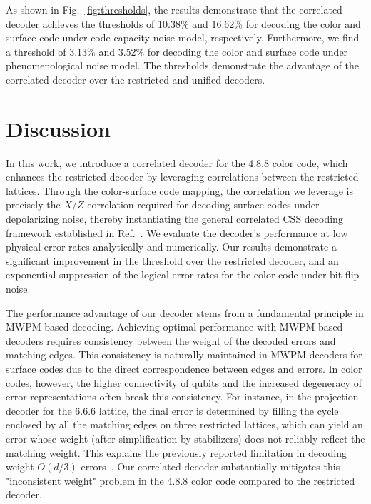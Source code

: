\documentclass[%
 reprint,
 amsmath,amssymb,
 aps,
]{revtex4-2}
\begin{document}
As shown in Fig.~\ref{fig:thresholds}, the results demonstrate that the correlated decoder achieves the thresholds of 10.38\% and 16.62\% for decoding the color and surface code under code capacity noise model, respectively. Furthermore, we find a threshold of 3.13\% and 3.52\% for decoding the color and surface code under phenomenological noise model. The thresholds demonstrate the advantage of the correlated decoder over the restricted and unified decoders.



\section{\label{sec:discussion}Discussion}

In this work, we introduce a correlated decoder for the 4.8.8 color code, which enhances the restricted decoder by leveraging correlations between the restricted lattices. Through the color-surface code mapping, the correlation we leverage is precisely the $X$/$Z$ correlation required for decoding surface codes under depolarizing noise, thereby instantiating the general correlated CSS decoding framework established in Ref.~\cite{delfosse2014decoding_cc}. We evaluate the decoder's performance at low physical error rates analytically and numerically. Our results demonstrate a significant improvement in the threshold over the restricted decoder, and an exponential suppression of the logical error rates for the color code under bit-flip noise.

The performance advantage of our decoder stems from a fundamental principle in MWPM-based decoding. Achieving optimal performance with MWPM-based decoders requires consistency between the weight of the decoded errors and matching edges. This consistency is naturally maintained in MWPM decoders for surface codes due to the direct correspondence between edges and errors. In color codes, however, the higher connectivity of qubits and the increased degeneracy of error representations often break this consistency. For instance, in the projection decoder for the 6.6.6 lattice, the final error is determined by filling the cycle enclosed by all the matching edges on three restricted lattices, which can yield an error whose weight (after simplification by stabilizers) does not reliably reflect the matching weight. This explains the previously reported limitation in decoding weight-$O(d/3)$ errors~\cite{sahay2022decoder}. Our correlated decoder substantially mitigates this "inconsistent weight" problem in the 4.8.8 color code compared to the restricted decoder. 
\end{document}

